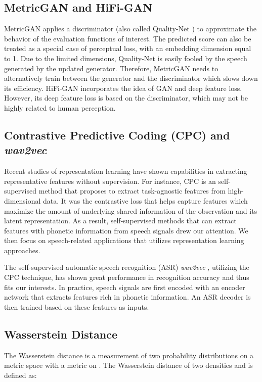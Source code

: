 \documentclass[a4paper]{article}
\begin{document}
\subsection{MetricGAN and HiFi-GAN}
\label{ssec:gan}
 MetricGAN \cite{fu2019metricgan} applies a discriminator (also called Quality-Net \cite{fu2018quality}) to approximate the behavior of the evaluation functions of interest. The predicted score can also be treated as a special case of perceptual loss, with an embedding dimension equal to 1. Due to the limited dimensions, Quality-Net is easily fooled by the speech generated by the updated generator. Therefore, MetricGAN needs to alternatively train between the generator and the discriminator which slows down its efficiency. HiFi-GAN \cite{su2020hifi} incorporates the idea of GAN and deep feature loss. However, its deep feature loss is based on the discriminator, which may not be highly related to human perception.

\subsection{Contrastive Predictive Coding (CPC) and \textit{wav2vec}}
\label{ssec:cpc_w2v}
Recent studies of representation learning have shown capabilities in extracting representative features without supervision.
For instance, CPC \cite{oord2018representation} is an self-supervised method that proposes to extract task-agnostic features from high-dimensional data. It was the contrastive loss that helps capture features which maximize the amount of underlying shared information of the observation and its latent representation.
As a result, self-supervised methods that can extract features with phonetic information from speech signals drew our attention.
We then focus on speech-related applications that utilizes representation learning approaches.
\par
The self-supervised automatic speech recognition (ASR) \textit{wav2vec} \cite{schneider2019wav2vec}, utilizing the CPC technique, has shown great performance in recognition accuracy and thus fits our interests. In practice, speech signals are first encoded with an encoder network that extracts features rich in phonetic information.
An ASR decoder is then trained based on these features as inputs.
\subsection{Wasserstein Distance}
\label{ssec:wasserstein}
The Wasserstein distance \cite{OLKIN1982257} is a measurement of two probability distributions on a metric space  with  a metric on . The Wasserstein distance of two densities  and  is defined as:
\end{document}
